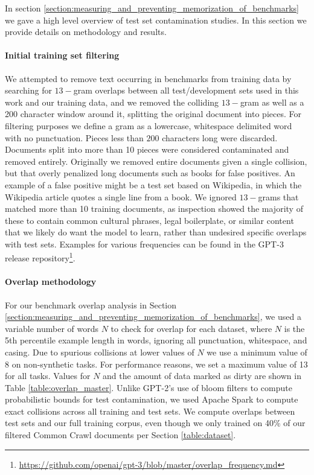 In section \ref{section:measuring_and_preventing_memorization_of_benchmarks} we gave a high level overview of test set contamination studies. In this section we provide details on methodology and results.

\paragraph{Initial training set filtering} We attempted to remove text occurring in benchmarks from training data by searching for $13-$gram overlaps between all test/development sets used in this work and our training data, and we removed the colliding $13-$gram as well as a 200 character window around it, splitting the original document into pieces. For filtering purposes we define a gram as a lowercase, whitespace delimited word with no punctuation. Pieces less than $200$ characters long were discarded. Documents split into more than 10 pieces were considered contaminated and removed entirely. Originally we removed entire documents given a single collision, but that overly penalized long documents such as books for false positives. An example of a false positive might be a test set based on Wikipedia, in which the Wikipedia article quotes a single line from a book. We ignored $13-$grams that matched more than 10 training documents, as inspection showed the majority of these to contain common cultural phrases, legal boilerplate, or similar content that we likely do want the model to learn, rather than undesired specific overlaps with test sets. Examples for various frequencies can be found in the GPT-3 release repository\footnote{\url{https://github.com/openai/gpt-3/blob/master/overlap_frequency.md}}.

\paragraph{Overlap methodology} For our benchmark overlap analysis in Section \ref{section:measuring_and_preventing_memorization_of_benchmarks}, we used a variable number of words $N$ to check for overlap for each dataset, where $N$ is the 5th percentile example length in words, ignoring all punctuation, whitespace, and casing. Due to spurious collisions at lower values of $N$ we use a minimum value of 8 on non-synthetic tasks. For performance reasons, we set a maximum value of 13 for all tasks. Values for $N$ and the amount of data marked as dirty are shown in Table \ref{table:overlap_master}. Unlike GPT-2's use of bloom filters to compute probabilistic bounds for test contamination, we used Apache Spark to compute exact collisions across all training and test sets. We compute overlaps between test sets and our full training corpus, even though we only trained on 40\% of our filtered Common Crawl documents per Section \ref{table:dataset}.

